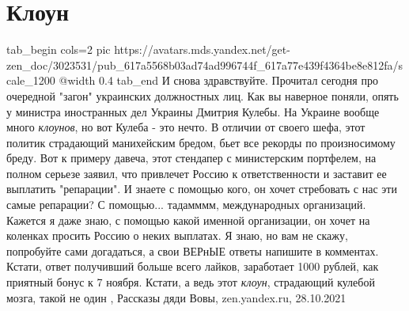  
 
 
 
 
\chapter{Клоун}

\ifcmt
  tab_begin cols=2
     pic https://avatars.mds.yandex.net/get-zen_doc/3023531/pub_617a5568b03ad74ad996744f_617a77e439f4364be8e812fa/scale_1200
		 @width 0.4
  tab_end
\fi
И снова здравствуйте. Прочитал сегодня про очередной "загон" украинских
должностных лиц. Как вы наверное поняли, опять у министра иностранных дел
Украины Дмитрия Кулебы. На Украине вообще много \emph{клоунов}, но вот Кулеба - это
нечто.  В отличии от своего шефа, этот политик страдающий манихейским бредом,
бьет все рекорды по произносимому бреду. Вот к примеру давеча, этот стендапер с
министерским портфелем, на полном серьезе заявил, что привлечет Россию к
ответственности и заставит ее выплатить "репарации".  И знаете с помощью кого,
он хочет стребовать с нас эти самые репарации? С помощью... тадамммм,
международных организаций. Кажется я даже знаю, с помощью какой именной
организации, он хочет на коленках просить Россию о неких выплатах. Я знаю, но
вам не скажу, попробуйте сами догадаться, а свои ВЕРнЫЕ ответы напишите в
комментах. Кстати, ответ получивший больше всего лайков, заработает 1000
рублей, как приятный бонус к 7 ноября.  Кстати, а ведь этот \emph{клоун}, страдающий
кулебой мозга, такой не один
, 
Рассказы дяди Вовы, zen.yandex.ru, 28.10.2021
